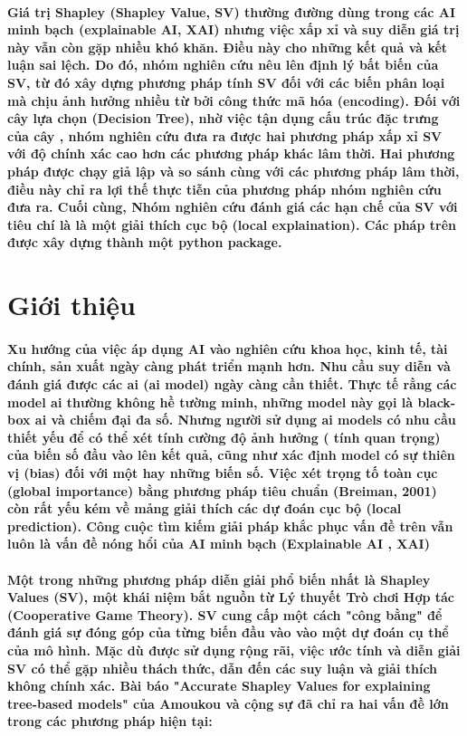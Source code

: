 \documentclass[12pt, a4paper]{article}
\begin{document}
\paragraph{
    Giá trị Shapley (Shapley Value, SV) thường đường dùng trong các AI minh bạch (explainable AI, XAI) nhưng  việc xấp xỉ và suy diễn giá trị này vẫn còn gặp nhiều khó khăn. Điều này cho những kết quả và kết luận sai lệch. Do đó, nhóm nghiên cứu nêu lên định lý bất biến của SV, từ đó xây dựng phương pháp tính SV đối với các biến phân loại mà chịu ảnh hưởng nhiều từ bởi công thức mã hóa (encoding). Đối với cây lựa chọn (Decision Tree), nhờ việc tận dụng cấu trúc đặc trưng của cây , nhóm nghiên cứu đưa ra được hai phương pháp xấp xỉ SV với độ chính xác cao hơn các phương pháp khác lâm thời. Hai phương pháp được chạy giả lập và so sánh cùng với các phương pháp lâm thời, điều này chỉ ra lợi thế thực tiễn của phương pháp nhóm nghiên cứu đưa ra. Cuối cùng, Nhóm nghiên cứu đánh giá  các hạn chế của SV với tiêu chí là là một giải thích cục bộ (local explaination). Các pháp trên được xây dựng thành một python package.  
}

\section{Giới thiệu}
\paragraph{
    Xu hướng của việc áp dụng AI vào nghiên cứu khoa học, kinh tế, tài chính, sản xuất ngày càng phát triển mạnh hơn. Nhu cầu suy diễn và đánh giá được các ai (ai model) ngày càng cần thiết. Thực tế rằng các model  ai thường không hề tường minh, những model này gọi là black-box ai và chiếm đại đa số. Nhưng người sử dụng ai models có nhu cầu thiết yếu để có thể xét tính cường độ ảnh hưởng ( tính quan trọng) của biến số đầu vào lên kết quả, cũng như xác định model có sự thiên vị (bias) đối với một hay những biến số. Việc xét  trọng tố toàn cục (global importance) bằng phương pháp tiêu chuẩn (Breiman, 2001) còn rất yếu kém về mảng giải thích các dự đoán cục bộ (local  prediction). Công cuộc tìm kiếm giải pháp khắc phục vấn đề trên vẫn luôn là vấn đề nóng hổi của AI minh bạch (Explainable AI , XAI) 
}
\paragraph{
Một trong những phương pháp diễn giải phổ biến nhất là Shapley Values (SV), một khái niệm bắt nguồn từ Lý thuyết Trò chơi Hợp tác (Cooperative Game Theory). SV cung cấp một cách "công bằng" để đánh giá sự đóng góp của từng biến đầu vào vào một dự đoán cụ thể của mô hình. Mặc dù được sử dụng rộng rãi, việc ước tính và diễn giải SV có thể gặp nhiều thách thức, dẫn đến các suy luận và giải thích không chính xác. Bài báo "Accurate Shapley Values for explaining tree-based models" của Amoukou và cộng sự đã chỉ ra hai vấn đề lớn trong các phương pháp hiện tại:
}
\end{document}
